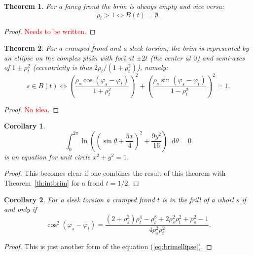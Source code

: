 \documentclass{article}
\newcommand{\be}{\begin{equation}}
\newcommand{\ee}{\end{equation}}
\newcommand*\df {\mathop{}\!\mathrm{d}}
\newcommand{\red}[1]{\textcolor{red}{#1}}
\theoremstyle{plain}
\newtheorem{theorem}{Theorem}[section]
\newtheorem{corollary}{Corollary}[theorem]
\theoremstyle{definition}
\begin{document}
    \begin{theorem}
        For a fancy frond the brim is always empty and vice versa: $$
            \rho_t>1 \Leftrightarrow B(t) = \emptyset
        .$$
    \end{theorem}
    \begin{proof}
        \red{Needs to be written.}
    \end{proof}

    \begin{theorem}
        For a cramped frond and a sleek torsion, the brim is represented by an ellipse on the complex plain with foci at $\pm 2t$ (the center at $0$) and semi-axes of $1\pm\rho_t^2$ (eccentricity is thus $2\rho_t/(1+\rho_t^2)$), namely:
        \be\label{eq:brimellipse}
            s \in B(t) \Leftrightarrow \left(\frac{\rho_s\cos(\varphi_s-\varphi_t)}{1+\rho_t^2}\right)^2 + \left(\frac{\rho_s\sin(\varphi_s-\varphi_t)}{1-\rho_t^2}\right)^2 = 1 
        .\ee
    \end{theorem}
    \begin{proof}
        \red{No idea.}
    \end{proof}

    \begin{corollary}
        $$
            \int_0^{2\pi} \ln\left(\left(\sin\theta+\frac{5x}4\right)^2+\frac{9y^2}{16}\right)\df{\theta} = 0  
        $$ is an equation for unit circle $x^2+y^2=1$.

    \end{corollary}

    \begin{proof}
        This becomes clear if one combines the result of this theorem with Theorem~\ref{th:intbrim} for a frond $t=1/2$.  
    \end{proof}
    \begin{corollary}
        For a sleek torsion a cramped frond $t$ is in the frill of a whorl $s$ if and only if 
        $$
            \cos^2(\varphi_s-\varphi_t) = \frac{(2 + \rho_s^2)\rho_t^4 - \rho_t^8 + 2\rho_s^2\rho_t^2 + \rho_s^2 - 1}{4\rho_s^2\rho_t^2}
        .$$
    \end{corollary}

    \begin{proof}
        This is just another form of the equation (\ref{eq:brimellipse}).  
    \end{proof}
\end{document}
